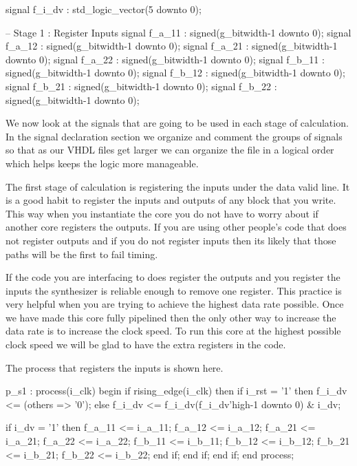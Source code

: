 \begin{VHDLlisting}[tabsize=2]
signal f_i_dv : std_logic_vector(5 downto 0);

-- Stage 1 : Register Inputs
signal f_a_11 : signed(g_bitwidth-1 downto 0);
signal f_a_12 : signed(g_bitwidth-1 downto 0);
signal f_a_21 : signed(g_bitwidth-1 downto 0);
signal f_a_22 : signed(g_bitwidth-1 downto 0);
signal f_b_11 : signed(g_bitwidth-1 downto 0);
signal f_b_12 : signed(g_bitwidth-1 downto 0);
signal f_b_21 : signed(g_bitwidth-1 downto 0);
signal f_b_22 : signed(g_bitwidth-1 downto 0);
\end{VHDLlisting}

We now look at the signals that are going to be used in each stage of calculation. In the signal declaration section we organize and comment the groups of signals so that as our \ac{VHDL} files get larger we can organize the file in a logical order which helps keeps the logic more manageable. 

The first stage of calculation is registering the inputs under the data valid line. It is a good habit to register the inputs and outputs of any block that you write. This way when you instantiate the core you do not have to worry about if another core registers the outputs. If you are using other people's code that does not register outputs and if you do not register inputs then its likely that those paths will be the first to fail timing. 

If the code you are interfacing to does register the outputs and you register the inputs the synthesizer is reliable enough to remove one register. This practice is very helpful when you are trying to achieve the highest data rate possible. Once we have made this core fully pipelined then the only other way to increase the data rate is to increase the clock speed. To run this core at the highest possible clock speed we will be glad to have the extra registers in the code. 

The process that registers the inputs is shown here. 

\begin{VHDLlisting}[tabsize=2]
p_s1 : process(i_clk)
    begin
        if rising_edge(i_clk) then
            if i_rst = '1' then
                f_i_dv <= (others => '0');
            else
                f_i_dv <= f_i_dv(f_i_dv'high-1 downto 0) & i_dv;
				
                if i_dv = '1' then
                    f_a_11  <= i_a_11;
                    f_a_12  <= i_a_12;
                    f_a_21  <= i_a_21;
                    f_a_22  <= i_a_22;
                    f_b_11  <= i_b_11;
                    f_b_12  <= i_b_12;
                    f_b_21  <= i_b_21;
                    f_b_22  <= i_b_22;
                end if;
            end if;
        end if;
    end process;
\end{VHDLlisting}

